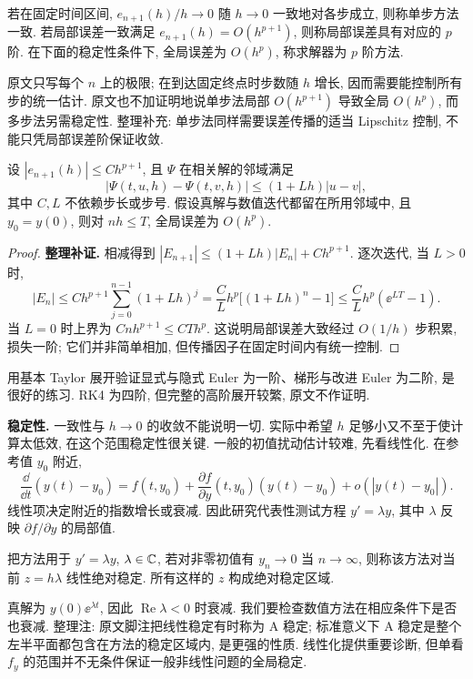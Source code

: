 \begin{definition}[一致性与阶]\label{def:ode-consistency-order}
若在固定时间区间, $e_{n+1}(h)/h\to0$ 随 $h\to0$ 一致地对各步成立, 则称单步方法一致. 若局部误差一致满足 $e_{n+1}(h)=O(h^{p+1})$, 则称局部误差具有对应的 $p$ 阶. 在下面的稳定性条件下, 全局误差为 $O(h^p)$, 称求解器为 $p$ 阶方法.
\end{definition}

原文只写每个 $n$ 上的极限; 在到达固定终点时步数随 $h$ 增长, 因而需要能控制所有步的统一估计. 原文也不加证明地说单步法局部 $O(h^{p+1})$ 导致全局 $O(h^p)$, 而多步法另需稳定性. 整理补充: 单步法同样需要误差传播的适当 Lipschitz 控制, 不能只凭局部误差阶保证收敛.

\begin{proposition}\label{prop:one-step-convergence}
设 $|e_{n+1}(h)|\leq Ch^{p+1}$, 且 $\Psi$ 在相关解的邻域满足
\[
|\Psi(t,u,h)-\Psi(t,v,h)|\leq(1+Lh)|u-v|,
\]
其中 $C,L$ 不依赖步长或步号. 假设真解与数值迭代都留在所用邻域中, 且 $y_0=y(0)$, 则对 $nh\leq T$, 全局误差为 $O(h^p)$.
\end{proposition}
\begin{proof}
\textbf{整理补证.} 相减得到 $|E_{n+1}|\leq(1+Lh)|E_n|+Ch^{p+1}$. 逐次迭代, 当 $L>0$ 时,
\[
|E_n|\leq Ch^{p+1}\sum_{j=0}^{n-1}(1+Lh)^j
=\frac CLh^p\bigl[(1+Lh)^n-1\bigr]
\leq\frac CLh^p(\ee^{LT}-1).
\]
当 $L=0$ 时上界为 $Cnh^{p+1}\leq CTh^p$. 这说明局部误差大致经过 $O(1/h)$ 步积累, 损失一阶; 它们并非简单相加, 但传播因子在固定时间内有统一控制.
\end{proof}

用基本 Taylor 展开验证显式与隐式 Euler 为一阶、梯形与改进 Euler 为二阶, 是很好的练习. RK4 为四阶, 但完整的高阶展开较繁, 原文不作证明.

\textbf{稳定性.} 一致性与 $h\to0$ 的收敛不能说明一切. 实际中希望 $h$ 足够小又不至于使计算太低效, 在这个范围稳定性很关键. 一般的初值扰动估计较难, 先看线性化. 在参考值 $y_0$ 附近,
\[
\frac{\dd}{\dd t}(y(t)-y_0)=f(t,y_0)+\frac{\partial f}{\partial y}(t,y_0)(y(t)-y_0)+o(|y(t)-y_0|).
\]
线性项决定附近的指数增长或衰减. 因此研究代表性测试方程 $y'=\lambda y$, 其中 $\lambda$ 反映 $\partial f/\partial y$ 的局部值.

\begin{definition}[线性绝对稳定性]\label{def:absolute-stability}
把方法用于 $y'=\lambda y$, $\lambda\in\mathbb C$, 若对非零初值有 $y_n\to0$ 当 $n\to\infty$, 则称该方法对当前 $z=h\lambda$ 线性绝对稳定. 所有这样的 $z$ 构成绝对稳定区域.
\end{definition}

真解为 $y(0)\ee^{\lambda t}$, 因此 $\operatorname{Re}\lambda<0$ 时衰减. 我们要检查数值方法在相应条件下是否也衰减. 整理注: 原文脚注把线性稳定有时称为 A 稳定; 标准意义下 A 稳定是整个左半平面都包含在方法的稳定区域内, 是更强的性质. 线性化提供重要诊断, 但单看 $f_y$ 的范围并不无条件保证一般非线性问题的全局稳定.

